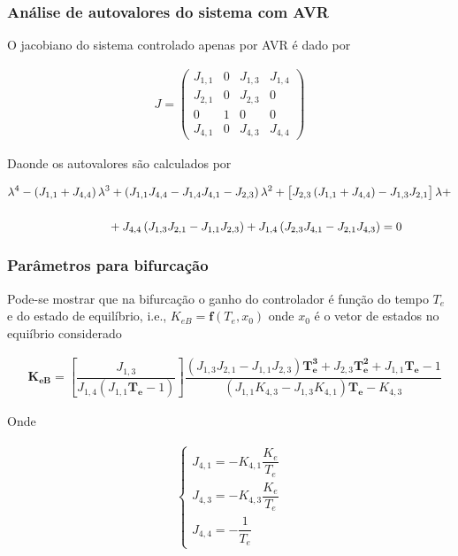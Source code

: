 \documentclass[10pt, compress,xcolor={svgnames,dvipsnames,x11names}]{beamer}
\begin{document}
\begin{frame}%
\frametitle{Análise de autovalores do sistema com AVR}
\scriptsize

	O jacobiano do sistema controlado apenas por AVR é dado por

\begin{gather}
J = \left(\begin{array}{cccc}
J_{1,1} & 0 & J_{1,3} & J_{1,4} \\
%
J_{2,1} & 0 & J_{2,3} & 0 \\
%
0 & 1 & 0 & 0\\
%
J_{4,1} & 0 & J_{4,3} & J_{4,4}
\end{array} \right)
\end{gather}

	Daonde os autovalores são calculados por

\begin{align}
&\lambda^4 - \left( J_{1,1} + J_{4,4} \right)\lambda^3 + \left( J_{1,1}J_{4,4} - J_{1,4}J_{4,1} - J_{2,3}\right)\lambda^2 + \left[\strut J_{2,3}\left( J_{1,1} + J_{4,4}\right) - J_{1,3}J_{2,1}\right]\lambda + \nonumber \\[5mm] & \hspace{3cm} + J_{4,4}\left( J_{1,3}J_{2,1} - J_{1,1}J_{2,3}\right)  + J_{1,4}\left( J_{2,3}J_{4,1} - J_{2,1}J_{4,3}\right)= 0  \label{eq::polinomioJacobianoAVR} 
\end{align}

\normalsize
\end{frame}%

\begin{frame}%
\frametitle{Parâmetros para bifurcação}
\scriptsize

	Pode-se mostrar que na bifurcação o ganho do controlador é função do tempo $T_e$ e do estado de equilíbrio, i.e., $K_{eB} = \mathbf{f}\left(T_e,x_0\right)$ onde $x_0$ é o vetor de estados no equiíbrio considerado

\begin{align}
&  \mathbf{K_{eB}} = \left[ \dfrac{J_{1,3}}{J_{1,4}\left(J_{1,1}\mathbf{T_e} - 1\right)}\right] \dfrac{ \left( J_{1,3}J_{2,1} - J_{1,1}J_{2,3}\right)\mathbf{T_e^3} + J_{2,3}\mathbf{T_e^2} + J_{1,1}\mathbf{T_e} - 1}{\left( J_{1,1}K_{4,3} - J_{1,3}K_{4,1} \right)\mathbf{T_e} - K_{4,3}} \label{eq::relacaoKeTe}
\end{align}

	Onde

\begin{gather}
\left\{ \begin{array}{l}
J_{4,1} = - K_{4,1} \dfrac{K_e}{T_e} \nonumber \\[5mm]
%
J_{4,3} = - K_{4,3} \dfrac{K_e}{T_e} \nonumber \\[5mm]
%
J_{4,4} = -\dfrac{1}{T_e} \nonumber
\end{array} \right.
\end{gather}

\normalsize
\end{frame}%
\end{document}
